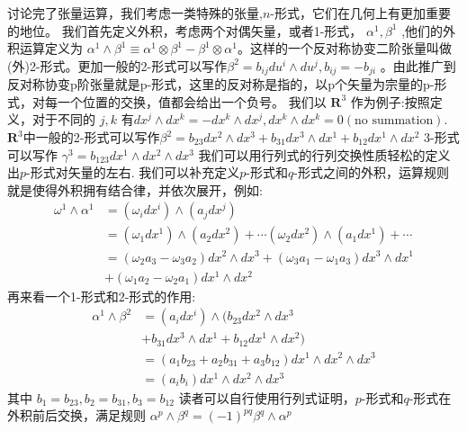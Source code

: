 \documentclass[supercite]{HustGraduPaper}
\begin{document}
\begin{appendices}
		讨论完了张量运算，我们考虑一类特殊的张量,$n$-形式，它们在几何上有更加重要的地位。
		我们首先定义外积，考虑两个对偶矢量，或者1-形式， $\alpha^1, \beta^1$ ,他们的外积运算定义为 $\alpha^1 \wedge \beta^1 \equiv \alpha^1 \otimes \beta^1 - \beta^1 \otimes \alpha^1 $。这样的一个反对称协变二阶张量叫做(外)2-形式。更加一般的2-形式可以写作$ \beta^2 = b_{ij} du^i \wedge du^j, b_{ij} = - b_{ji}$ 。由此推广到反对称协变p阶张量就是p-形式，这里的反对称是指的，以p个矢量为宗量的p-形式，对每一个位置的交换，值都会给出一个负号。
		我们以 $\mathbf{R}^3$ 作为例子:按照定义，对于不同的 $j,k$ 有$dx^j \wedge dx^k = - dx^k \wedge dx^j , dx^k\wedge dx^k = 0 (\text{no summation}) $.
		$\mathbf{R}^3$中一般的2-形式可以写作$ \beta ^2 = b_{23} dx^2 \wedge dx^3 + b_{31} dx^3 \wedge dx^1 + b_{12} dx^1 \wedge dx^2 $
		3-形式可以写作 $\gamma^3 = b_{123} dx^1\wedge dx^2 \wedge dx^3$ 
		我们可以用行列式的行列交换性质轻松的定义出$p$-形式对矢量的左右.
		我们可以补充定义$p$-形式和$q$-形式之间的外积，运算规则就是使得外积拥有结合律，并依次展开，例如:
		\begin{equation}
		\begin{aligned} \omega^1 \wedge \alpha^1 &= (\omega_i dx^i)\wedge(a_j dx^j) \\ &=(\omega_1 dx^1)\wedge (a_2 dx^2)+\cdots (\omega_2 dx^2)\wedge(a_1 dx^1) + \cdots \\  &=(\omega_2 a_3 - \omega_3 a_2)dx^2\wedge dx^3 + (\omega_3 a_1- \omega_1 a_3)dx^3 \wedge dx^1 \\ &+ (\omega_1 a_2 - \omega_2 a_1)dx^1 \wedge dx^2 \end{aligned} 
		\end{equation}
		再来看一个1-形式和2-形式的作用:
		\begin{equation}
				\begin{aligned} \alpha^1 \wedge \beta^2 &= (a_i dx^i) \wedge (b_{23} dx^2 \wedge dx^3\\ &+b_{31}dx^3 \wedge dx^1 + b_{12}dx^1 \wedge dx^2)\\ &=(a_1 b_{23} + a_2 b_{31} + a_3 b_{12})dx^1\wedge dx^2\wedge dx^3\\ &=(a_i b_i)dx^1\wedge dx^2\wedge dx^3 \end{aligned} 
		\end{equation}
		其中 $b_1 = b_{23}, b_2 = b_{31},b_3 = b_{12} $
		读者可以自行使用行列式证明，$p$-形式和$q$-形式在外积前后交换，满足规则 $\alpha^p \wedge \beta^q = (-1)^{pq} \beta^q \wedge \alpha^p $
		

\end{appendices}
\end{document}
